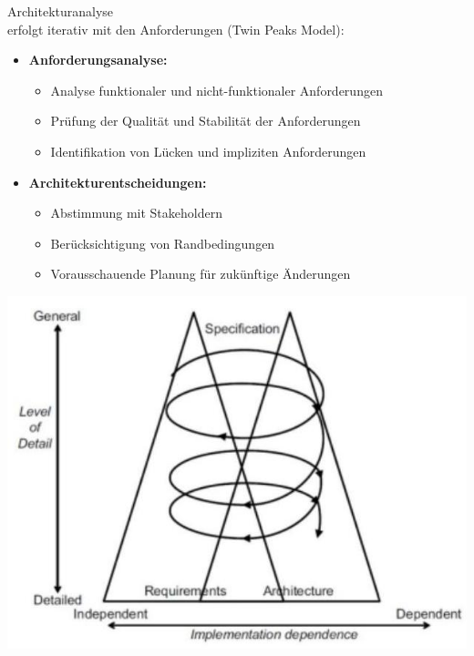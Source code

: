 \begin{concept}{Architekturanalyse}\\
erfolgt iterativ mit den Anforderungen (Twin Peaks Model):

\begin{itemize}
    \item \textbf{Anforderungsanalyse:}
    \begin{itemize}
        \item Analyse funktionaler und nicht-funktionaler Anforderungen
        \item Prüfung der Qualität und Stabilität der Anforderungen
        \item Identifikation von Lücken und impliziten Anforderungen
    \end{itemize}
    
    \item \textbf{Architekturentscheidungen:}
    \begin{itemize}
        \item Abstimmung mit Stakeholdern
        \item Berücksichtigung von Randbedingungen
        \item Vorausschauende Planung für zukünftige Änderungen
    \end{itemize}
\end{itemize}

\includegraphics[width=0.9\linewidth]{images/2024_12_29_0d1d7b5551ea1b4b41bdg-08}
\end{concept}


